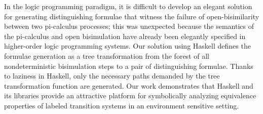 In the logic programming paradigm, it is difficult to develop
an elegant solution for generating distinguishing formulae that
witness the failure of open-bisimilarity between two pi-calculus processes;
this was unexpected because the semantics of the pi-calculus and
open bisimulation have already been elegantly specified
in higher-order logic programming systems.
Our solution using Haskell defines the formulae generation as a tree transformation from
the forest of all nondeterministic bisimulation steps to a pair of distinguishing formulae.
Thanks to laziness in Haskell, only the necessary paths demanded by the tree transformation
function are generated. Our work demonstrates that Haskell and its libraries
provide an attractive platform for symbolically analyzing equivalence properties of
labeled transition systems in an environment sensitive setting.

